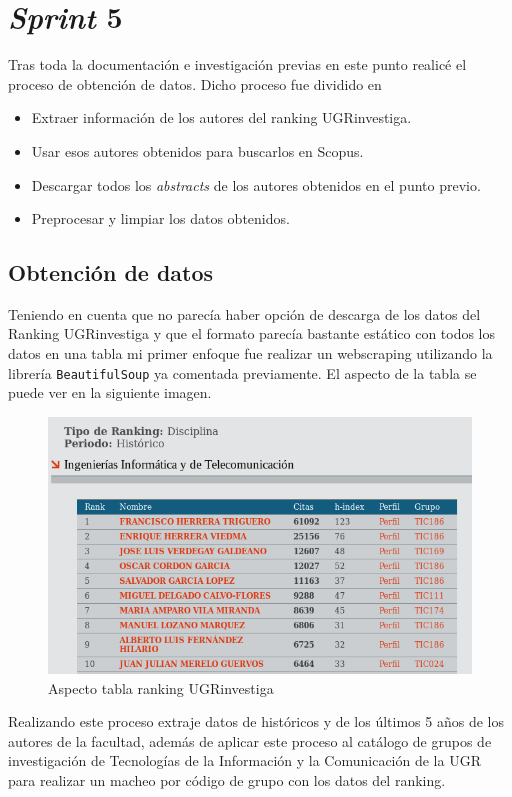\section{\textit{Sprint} 5}
Tras toda la documentación e investigación previas en este punto realicé el proceso de obtención de datos. Dicho proceso fue dividido en 
\begin{itemize}
	\item Extraer información de los autores del ranking UGRinvestiga.
	\item Usar esos autores obtenidos para buscarlos en Scopus.
	\item Descargar todos los \textit{abstracts} de los autores obtenidos en el punto previo.
	\item Preprocesar y limpiar los datos obtenidos.
\end{itemize}

\subsection{Obtención de datos}

Teniendo en cuenta que no parecía haber opción de descarga de los datos del Ranking UGRinvestiga y que el formato parecía bastante estático con todos los datos en una tabla mi primer enfoque fue realizar un \gls{webscraping} utilizando la librería \texttt{BeautifulSoup} ya comentada previamente. El aspecto de la tabla se puede ver en la siguiente imagen.


\begin{figure}[h!]
	
	\centering
	\includegraphics[width=0.9\linewidth]{imagenes/aspectoRankingUGRi}
	\caption{Aspecto tabla ranking UGRinvestiga}
\end{figure}

Realizando este proceso extraje datos de históricos y de los últimos 5 años de los autores de la facultad, además de aplicar este proceso al catálogo de grupos de investigación de Tecnologías de la Información y la Comunicación de la  \acrshort{UGR} para realizar un macheo por código de grupo con los datos del ranking.

